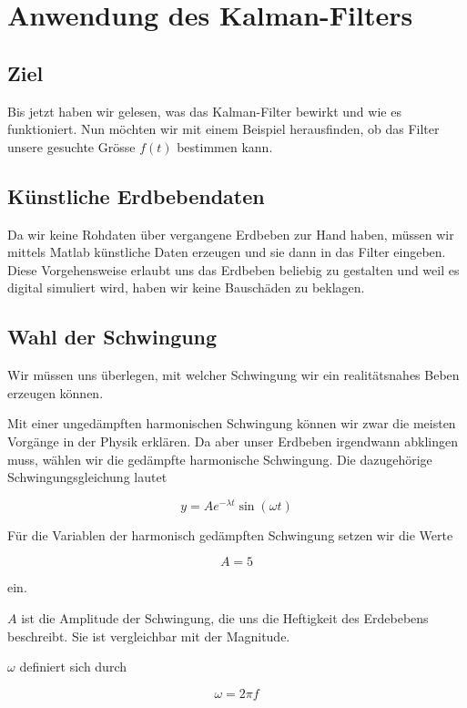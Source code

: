 \section{Anwendung des Kalman-Filters}
\subsection{Ziel}
Bis jetzt haben wir gelesen, was das Kalman-Filter bewirkt und wie es funktioniert.
Nun möchten wir mit einem Beispiel herausfinden,
ob das Filter unsere gesuchte Grösse $f(t)$ bestimmen kann.

\subsection{Künstliche Erdbebendaten}
Da wir keine Rohdaten über vergangene Erdbeben zur Hand haben, müssen wir mittels Matlab künstliche Daten erzeugen und sie dann in das Filter eingeben.
Diese Vorgehensweise erlaubt uns das Erdbeben beliebig zu gestalten
und weil es digital simuliert wird,
haben wir keine Bauschäden zu beklagen.

\subsection{Wahl der Schwingung}
Wir müssen uns überlegen, mit welcher Schwingung wir ein realitätsnahes Beben erzeugen können.

Mit einer ungedämpften harmonischen Schwingung können wir zwar die meisten Vorgänge in der Physik erklären.
Da aber unser Erdbeben irgendwann abklingen muss, wählen wir die gedämpfte harmonische Schwingung.
Die dazugehörige Schwingungsgleichung lautet

\begin{equation}
	y = A e^{-\lambda t} \sin(\omega t)
\end{equation}

Für die Variablen der harmonisch gedämpften Schwingung setzen wir die Werte

\begin{equation}
A = 5
\end{equation}

ein.

$A$ ist die Amplitude der Schwingung, die uns die Heftigkeit des Erdebebens beschreibt.
Sie ist vergleichbar mit der Magnitude.

$\omega$ definiert sich durch

\begin{equation}
	\omega = 2 \pi f
\end{equation}

